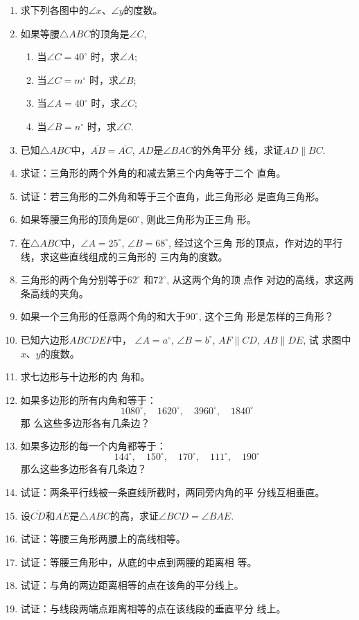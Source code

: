 \begin{ex}
\begin{enumerate}
    \item 求下列各图中的$\angle x$、$\angle y$的度数。
    \item 如果等腰$\triangle ABC$的顶角是$\angle C$, 
\begin{enumerate}
\item 当$\angle C=40^{\circ}$ 时，求$\angle A$;
\item 当$\angle C=m^{\circ}$ 时，求$\angle B$;
\item 当$\angle A=40^{\circ}$ 时，求$\angle C$;
\item 当$\angle B=n^{\circ}$ 时，求$\angle C$.
\end{enumerate}

\item 已知$\triangle ABC$中，$\overline{AB}=\overline{AC}$, $AD$是$\angle BAC$的外角平分
    线，求证$AD\parallel BC$.
    \item 求证：三角形的两个外角的和减去第三个内角等于二个
    直角。
    \item 试证：若三角形的二外角和等于三个直角，此三角形必
    是直角三角形。
    \item 如果等腰三角形的顶角是$60^{\circ}$, 则此三角形为正三角
    形。
    \item 在$\triangle ABC$中，$\angle A=25^{\circ}$, $\angle B=68^{\circ}$, 经过这个三角
    形的顶点，作对边的平行线，求这些直线组成的三角形的
    三内角的度数。
    \item 三角形的两个角分别等于$62^{\circ}$ 和$72^{\circ}$, 从这两个角的顶
    点作
    对边的高线，求这两条高线的夹角。
    \item 如果一个三角形的任意两个角的和大于$90^{\circ}$, 这个三角
    形是怎样的三角形？
\item 已知六边形$ABCDEF$中，
$\angle A=a^{\circ}$, $\angle B=b^{\circ}$, 
$AF\parallel CD$, $AB\parallel DE$, 试
求图中$x$、$y$的度数。
\item 求七边形与十边形的内
角和。
\item 如果多边形的所有内角和等于：
\[1080^{\circ} ,\quad 1620^{\circ}  ,\quad 3960^{\circ}  ,\quad 1840^{\circ}\]那
么这些多边形各有几条边？
\item 如果多边形的每一个内角都等于：
\[144^{\circ} ,\quad 150^{\circ}  ,\quad 170^{\circ}  ,\quad 111^{\circ} 
,\quad 190^{\circ}\] 
那么这些多边形各有几条边？
\item 试证：两条平行线被一条直线所截时，两同旁内角的平
分线互相垂直。
\item 设$\overline{CD}$和$\overline{AE}$是$\triangle ABC$的高，求证$\angle BCD=\angle BAE$.
\item 试证：等腰三角形两腰上的高线相等。
\item 试证：等腰三角形中，从底的中点到两腰的距离相
等。
\item 试证：与角的两边距离相等的点在该角的平分线上。
\item 试证：与线段两端点距离相等的点在该线段的垂直平分
线上。
\end{enumerate}
\end{ex}


